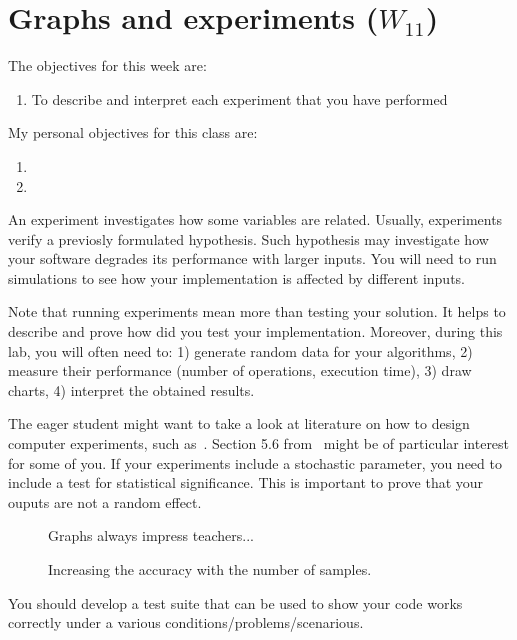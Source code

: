 \documentclass[a4paper,12pt]{report}
\begin{document}
\chapter{Graphs and experiments ($W_{11}$)}

The objectives for this week are:
\begin{enumerate}
 \item To describe and interpret each experiment that you have performed
\end{enumerate}

\vspace{0.5cm}

My personal objectives for this class are:
\begin{enumerate}
 \item 
 \item 
\end{enumerate}


An experiment investigates how some variables are related. 
Usually, experiments verify a previosly formulated hypothesis.
Such hypothesis may investigate how your software degrades its performance with larger inputs.
You will need to run simulations to see how your implementation is affected by different inputs.


Note that running experiments mean more than testing your solution. 
It helps to describe and prove how did you test your implementation.
Moreover, during this lab, you will often need to: 
1) generate random data for your algorithms,
2) measure their performance (number of operations, execution time),
3) draw charts,
4) interpret the obtained results.

The eager student might want to take a look at literature on how to design computer experiments, such as~\cite{fang2005design}. Section 5.6 from~\cite{fang2005design} might be of particular interest for some of you. 
If your experiments include a stochastic parameter, you need to include a test for statistical significance. 
This is important to prove that your ouputs are not a random effect.



\begin{figure}
Graphs always impress teachers...
\caption{Increasing the accuracy with the number of samples.}
\label{fig:accuracy}
\end{figure}

You should develop a test suite that can be used to show your code works correctly under a various conditions/problems/scenarious.
\end{document}
